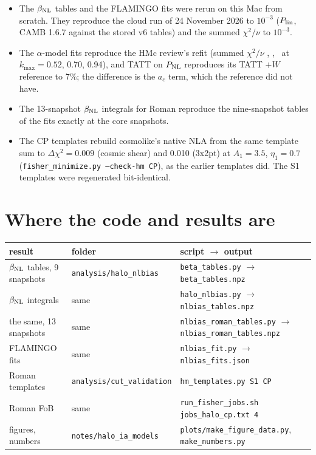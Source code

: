 \documentclass[11pt]{article}
\newcommand{\Plin}{P_{\rm lin}}
\newcommand{\PNL}{P_{\rm NL}}
\newcommand{\bNL}{\beta_{\rm NL}}
\newcommand{\kmax}{k_{\max}}
\newcommand{\Nsnap}{13}            %
\begin{document}
\begin{itemize}
\item The $\bNL$ tables and the FLAMINGO fits were rerun on this Mac from
  scratch. They reproduce the cloud run of 24 November 2026 to $10^{-3}$
  ($\Plin$, CAMB 1.6.7 against the stored v6 tables) and the summed
  $\chi^2/\nu$ to $10^{-3}$.
\item The $\alpha$-model fits reproduce the HMc review's refit (summed
  $\chi^2/\nu$ \gofTattAlphaA, \gofTattAlphaB, \gofTattAlphaC\ at
  $\kmax = 0.52$, 0.70, 0.94), and TATT on $\PNL$ reproduces its TATT $+ W$
  reference to 7\%; the difference is the $a_c$ term, which the reference
  did not have.
\item The \Nsnap-snapshot $\bNL$ integrals for Roman reproduce the
  nine-snapshot tables of the fits exactly at the core snapshots.
\item The CP templates rebuild cosmolike's native NLA from the same
  template sum to $\Delta\chi^2 = 0.009$ (cosmic shear) and 0.010 (3x2pt) at
  $A_1 = 3.5$, $\eta_1 = 0.7$ (\texttt{fisher\_minimize.py --check-hm CP}),
  as the earlier templates did. The S1 templates were regenerated
  bit-identical.
\end{itemize}

\section{Where the code and results are}
\label{app:code}

\begin{center}\footnotesize
\begin{tabular}{lll}
\toprule
result & folder & script $\rightarrow$ output \\
\midrule
$\bNL$ tables, 9 snapshots & \texttt{analysis/halo\_nlbias} & \texttt{beta\_tables.py} $\rightarrow$ \texttt{beta\_tables.npz} \\
$\bNL$ integrals & same & \texttt{halo\_nlbias.py} $\rightarrow$ \texttt{nlbias\_tables.npz} \\
the same, 13 snapshots & same & \texttt{nlbias\_roman\_tables.py} $\rightarrow$ \texttt{nlbias\_roman\_tables.npz} \\
FLAMINGO fits & same & \texttt{nlbias\_fit.py} $\rightarrow$ \texttt{nlbias\_fits.json} \\
Roman templates & \texttt{analysis/cut\_validation} & \texttt{hm\_templates.py S1 CP} \\
Roman FoB & same & \texttt{run\_fisher\_jobs.sh jobs\_halo\_cp.txt 4} \\
figures, numbers & \texttt{notes/halo\_ia\_models} & \texttt{plots/make\_figure\_data.py}, \texttt{make\_numbers.py} \\
\bottomrule
\end{tabular}
\end{center}
\end{document}
